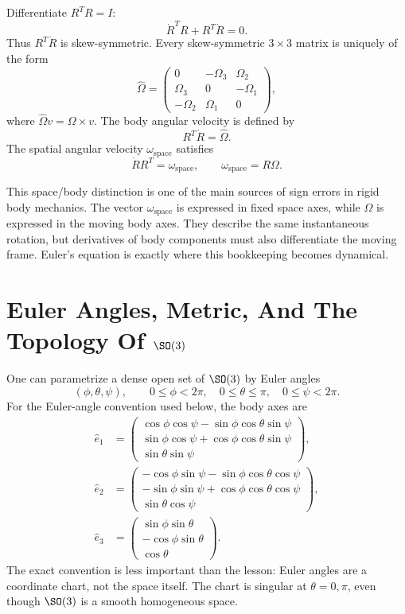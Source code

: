 Differentiate \(R^TR=I\):
\[
  \dot R^TR+R^T\dot R=0.
\]
Thus \(R^T\dot R\) is skew-symmetric. Every skew-symmetric \(3\times3\) matrix
is uniquely of the form
\[
  \widehat\Omega=
  \begin{pmatrix}
  0 & -\Omega_3 & \Omega_2\\
  \Omega_3 & 0 & -\Omega_1\\
  -\Omega_2 & \Omega_1 & 0
  \end{pmatrix},
\]
where \(\widehat\Omega v=\Omega\times v\). The body angular velocity is defined
by
\[
  R^T\dot R=\widehat\Omega.
\]
The spatial angular velocity \(\omega_{\mathrm{space}}\) satisfies
\[
  \dot R R^T=\widehat{\omega}_{\mathrm{space}},
  \qquad
  \omega_{\mathrm{space}}=R\Omega.
\]

This space/body distinction is one of the main sources of sign errors in rigid
body mechanics. The vector \(\omega_{\mathrm{space}}\) is expressed in fixed
space axes, while \(\Omega\) is expressed in the moving body axes. They describe
the same instantaneous rotation, but derivatives of body components must also
differentiate the moving frame. Euler's equation is exactly where this
bookkeeping becomes dynamical.

\section{\texorpdfstring{Euler Angles, Metric, And The Topology Of \(\SO(3)\)}{Euler Angles, Metric, And The Topology Of SO(3)}}
\label{sec:euler-angles-so3}

One can parametrize a dense open set of \(\SO(3)\) by Euler angles
\[
  (\phi,\theta,\psi),
  \qquad
  0\leq \phi<2\pi,\quad 0\leq \theta\leq \pi,\quad 0\leq \psi<2\pi.
\]
For the Euler-angle convention used below, the body axes are
\[
\begin{aligned}
\hat e_1 &=
\begin{pmatrix}
\cos\phi\cos\psi-\sin\phi\cos\theta\sin\psi\\
\sin\phi\cos\psi+\cos\phi\cos\theta\sin\psi\\
\sin\theta\sin\psi
\end{pmatrix},\\
\hat e_2 &=
\begin{pmatrix}
-\cos\phi\sin\psi-\sin\phi\cos\theta\cos\psi\\
-\sin\phi\sin\psi+\cos\phi\cos\theta\cos\psi\\
\sin\theta\cos\psi
\end{pmatrix},\\
\hat e_3 &=
\begin{pmatrix}
\sin\phi\sin\theta\\
-\cos\phi\sin\theta\\
\cos\theta
\end{pmatrix}.
\end{aligned}
\]
The exact convention is less important than the lesson: Euler angles are a
coordinate chart, not the space itself. The chart is singular at
\(\theta=0,\pi\), even though \(\SO(3)\) is a smooth homogeneous space.

